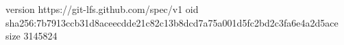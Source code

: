 version https://git-lfs.github.com/spec/v1
oid sha256:7b7913ccb31d8aceecdde21c82c13b8dcd7a75a001d5fc2bd2c3fa6e4a2d5ace
size 3145824
